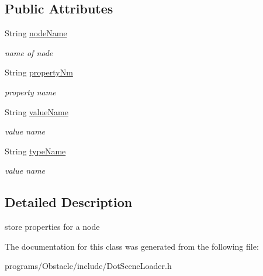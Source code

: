 \subsection*{Public Attributes}
\begin{DoxyCompactItemize}
\item 
String \hyperlink{class_ogre_1_1node_property_ab384a23c387d1a563ab18e273761e76b}{node\+Name}\hypertarget{class_ogre_1_1node_property_ab384a23c387d1a563ab18e273761e76b}{}\label{class_ogre_1_1node_property_ab384a23c387d1a563ab18e273761e76b}

\begin{DoxyCompactList}\small\item\em name of node \end{DoxyCompactList}\item 
String \hyperlink{class_ogre_1_1node_property_a1f7f77ea3c31717199424086459b2bdd}{property\+Nm}\hypertarget{class_ogre_1_1node_property_a1f7f77ea3c31717199424086459b2bdd}{}\label{class_ogre_1_1node_property_a1f7f77ea3c31717199424086459b2bdd}

\begin{DoxyCompactList}\small\item\em property name \end{DoxyCompactList}\item 
String \hyperlink{class_ogre_1_1node_property_ae5b83b85b5a38575c7ee784c7a8c36e6}{value\+Name}\hypertarget{class_ogre_1_1node_property_ae5b83b85b5a38575c7ee784c7a8c36e6}{}\label{class_ogre_1_1node_property_ae5b83b85b5a38575c7ee784c7a8c36e6}

\begin{DoxyCompactList}\small\item\em value name \end{DoxyCompactList}\item 
String \hyperlink{class_ogre_1_1node_property_a81d48ac5e4506389f5c7a7733717776b}{type\+Name}\hypertarget{class_ogre_1_1node_property_a81d48ac5e4506389f5c7a7733717776b}{}\label{class_ogre_1_1node_property_a81d48ac5e4506389f5c7a7733717776b}

\begin{DoxyCompactList}\small\item\em value name \end{DoxyCompactList}\end{DoxyCompactItemize}


\subsection{Detailed Description}
store properties for a node 

The documentation for this class was generated from the following file\+:\begin{DoxyCompactItemize}
\item 
programs/\+Obstacle/include/Dot\+Scene\+Loader.\+h\end{DoxyCompactItemize}
